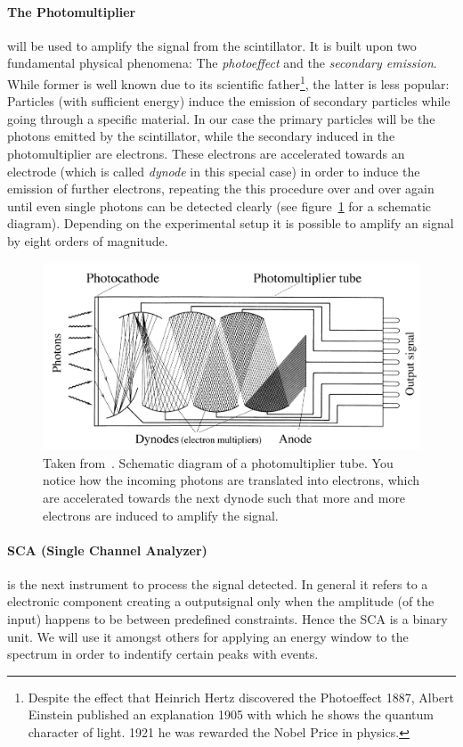 \paragraph{The Photomultiplier} will be used to amplify the signal from the scintillator. It is built upon
two fundamental physical phenomena: The \textit{photoeffect} and the \textit{secondary emission}. While former
is well known due to its scientific father\footnote{Despite the effect that Heinrich Hertz discovered the 
Photoeffect 1887, Albert Einstein published an explanation 1905 with which he shows the quantum character
of light. 1921 he was rewarded the Nobel Price in physics.}, the latter is less popular: Particles (with
sufficient energy) induce the emission of secondary particles while going through a specific material. In
our case the primary particles will be the photons emitted by the scintillator, while the secondary induced
in the photomultiplier are electrons. These electrons are accelerated towards an electrode (which is called
\textit{dynode} in this special case) in order to induce the emission of further electrons, repeating the
this procedure over and over again until even single photons can be detected clearly
(see figure~\ref{fig:photomultiplier} for a schematic diagram).
Depending on the experimental setup it is possible to amplify an signal by eight orders of magnitude. 
\begin{figure}[htpb]
    \centering
    \includegraphics[width=0.8\linewidth]{figures/photomultiplier}
    \caption{Taken from~\cite{bettini2008introduction}. Schematic diagram of a photomultiplier tube. You
        notice how the incoming photons are translated into electrons, which are accelerated towards the
        next dynode such that more and more electrons are induced to amplify the signal.}
    \label{fig:photomultiplier}
\end{figure}
\paragraph{SCA (Single Channel Analyzer)} is the next instrument to process the signal detected. In general
it refers to a electronic component creating a outputsignal only when the amplitude (of the input) happens to be
between predefined constraints. Hence the SCA is a binary unit. We will use it amongst others for
applying an energy window to the spectrum in order to indentify certain peaks with events. 
